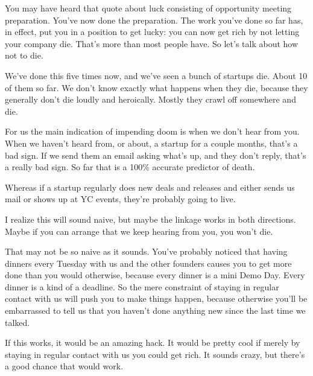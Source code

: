 You may
                    have heard that quote about luck consisting of opportunity
                    meeting preparation. You've now done the preparation. The
                    work you've done so far has, in effect, put you in a
                    position to get lucky: you can now get rich by not letting
                    your company die. That's more than most people have. So
                    let's talk about how not to die.

We've done this
                    five times now, and we've seen a bunch of startups die.
                    About 10 of them so far. We don't know exactly what happens
                    when they die, because they generally don't die loudly and
                    heroically. Mostly they crawl off somewhere and die.

For
                    us the main indication of impending doom is when we don't
                    hear from you. When we haven't heard from, or about, a
                    startup for a couple months, that's a bad sign. If we send
                    them an email asking what's up, and they don't reply, that's
                    a really bad sign. So far that is a 100\% accurate predictor
                    of death.

Whereas if a startup regularly does new
                    deals and releases and either sends us mail or shows up at
                    YC events, they're probably going to live.

I
                    realize this will sound naive, but maybe the linkage works
                    in both directions. Maybe if you can arrange that we keep
                    hearing from you, you won't die.

That may not be
                    so naive as it sounds. You've probably noticed that having
                    dinners every Tuesday with us and the other founders causes
                    you to get more done than you would otherwise, because every
                    dinner is a mini Demo Day. Every dinner is a kind of a
                    deadline. So the mere constraint of staying in regular
                    contact with us will push you to make things happen, because
                    otherwise you'll be embarrassed to tell us that you haven't
                    done anything new since the last time we talked.

If
                    this works, it would be an amazing hack. It would be pretty
                    cool if merely by staying in regular contact with us you
                    could get rich. It sounds crazy, but there's a good chance
                    that would work.

